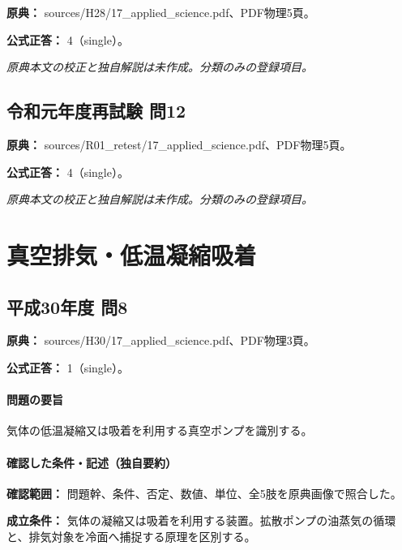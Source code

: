 \noindent\textbf{原典：} sources/H28/17\_applied\_science.pdf、PDF物理5頁。

\textbf{公式正答：} 4（single）。

\par\textit{原典本文の校正と独自解説は未作成。分類のみの登録項目。}

\subsection{令和元年度再試験 問12}
\label{q:r01-ret-applied-12}

\noindent\textbf{原典：} sources/R01\_retest/17\_applied\_science.pdf、PDF物理5頁。

\textbf{公式正答：} 4（single）。

\par\textit{原典本文の校正と独自解説は未作成。分類のみの登録項目。}

\section{真空排気・低温凝縮吸着}

\subsection{平成30年度 問8}
\label{q:h30-reg-applied-08}

\noindent\textbf{原典：} sources/H30/17\_applied\_science.pdf、PDF物理3頁。

\textbf{公式正答：} 1（single）。

\paragraph{問題の要旨} 気体の低温凝縮又は吸着を利用する真空ポンプを識別する。

\paragraph{確認した条件・記述（独自要約）}\mbox{}\par

\noindent\textbf{確認範囲：} 問題幹、条件、否定、数値、単位、全5肢を原典画像で照合した。\par

\noindent\textbf{成立条件：} 気体の凝縮又は吸着を利用する装置。拡散ポンプの油蒸気の循環と、排気対象を冷面へ捕捉する原理を区別する。\par


